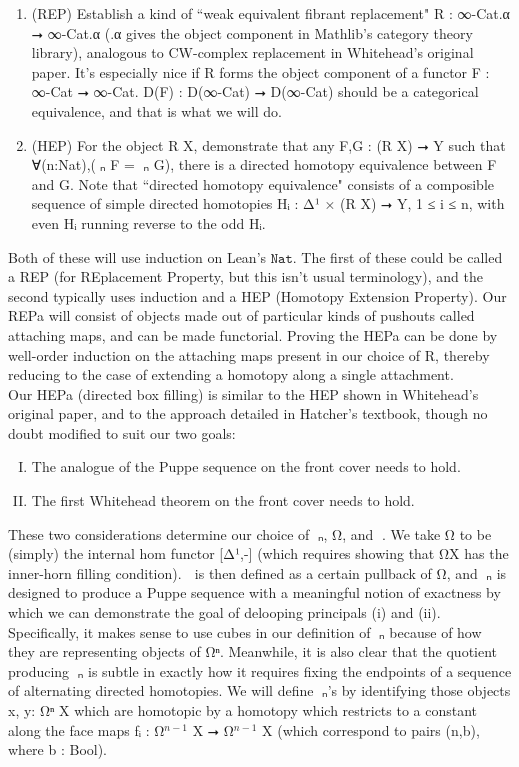\documentclass{book}
\theoremstyle{definition}
\begin{document}
\begin{enumerate}
\item (REP) Establish a kind of ``weak equivalent fibrant replacement" R : ∞-Cat.α ⭢ ∞-Cat.α (.α gives the object component in Mathlib's category theory library), analogous to CW-complex replacement in Whitehead's original paper. It's especially nice if R forms the object component of a functor F : ∞-Cat ⭢ ∞-Cat. D(F) : D(∞-Cat) ⭢ D(∞-Cat) should be a categorical equivalence, and that is what we will do.
\item (HEP) For the object R X, demonstrate that any F,G : (R X) ⭢ Y such that ∀(n:Nat),(π⃗ₙ F = π⃗ₙ G), there is a directed homotopy equivalence between F and G. Note that ``directed homotopy equivalence" consists of a composible sequence of simple directed homotopies Hᵢ : Δ¹ × (R X) ⭢ Y, 1 ≤ i ≤ n, with even Hᵢ running reverse to the odd Hᵢ.
\end{enumerate} 

Both of these will use induction on Lean's $\texttt{Nat}$. The first of these could be called a REP (for REplacement Property, but this isn't usual terminology), and the second typically uses induction and a HEP (Homotopy Extension Property). Our REPa will consist of objects made out of particular kinds of pushouts called attaching maps, and can be made functorial. Proving the HEPa can be done by well-order induction on the attaching maps present in our choice of R, thereby reducing to the case of extending a homotopy along a single attachment.\\

Our HEPa (directed box filling) is similar to the HEP shown in Whitehead's original paper, and to the approach detailed in Hatcher's textbook, though no doubt modified to suit our two goals:

\begin{enumerate}[(I)]
\item The analogue of the Puppe sequence on the front cover needs to hold.
\item The first Whitehead theorem on the front cover needs to hold.
\end{enumerate}

These two considerations determine our choice of π⃗ₙ, Ω⃗, and ω⃗. We take Ω⃗ to be (simply) the internal hom functor [Δ¹,-] (which requires showing that Ω⃗X has the inner-horn filling condition). ω⃗ is then defined as a certain pullback of Ω⃗, and π⃗ₙ is designed to produce a Puppe sequence with a meaningful notion of exactness by which we can demonstrate the goal of delooping principals (i) and (ii). Specifically, it makes sense to use cubes in our definition of π⃗ₙ because of how they are representing objects of Ω⃗ⁿ. Meanwhile, it is also clear that the quotient producing π⃗ₙ is subtle in exactly how it requires fixing the endpoints of a sequence of alternating directed homotopies. We will define π⃗ₙ's by identifying those objects x, y: Ω⃗ⁿ X which are homotopic by a homotopy which restricts to a constant along the face maps fᵢ : Ω⃗${}^{n-1}$ X ⭢ Ω⃗${}^{n-1}$ X (which correspond to pairs (n,b), where b : Bool).\\
\end{document}
